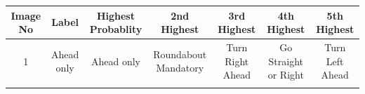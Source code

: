 \documentclass[11pt]{article}
\begin{document}
\begin{longtable}[]{@{}ccccccc@{}}
\toprule
\begin{minipage}[b]{0.04\columnwidth}\centering\strut
Image No\strut
\end{minipage} & \begin{minipage}[b]{0.04\columnwidth}\centering\strut
Label\strut
\end{minipage} & \begin{minipage}[b]{0.04\columnwidth}\centering\strut
Highest Probablity\strut
\end{minipage} & \begin{minipage}[b]{0.04\columnwidth}\centering\strut
2nd Highest\strut
\end{minipage} & \begin{minipage}[b]{0.04\columnwidth}\centering\strut
3rd Highest\strut
\end{minipage} & \begin{minipage}[b]{0.04\columnwidth}\centering\strut
4th Highest\strut
\end{minipage} & \begin{minipage}[b]{0.04\columnwidth}\centering\strut
5th Highest\strut
\end{minipage}\tabularnewline
\midrule
\endhead
\begin{minipage}[t]{0.04\columnwidth}\centering\strut
1\strut
\end{minipage} & \begin{minipage}[t]{0.04\columnwidth}\centering\strut
Ahead only\strut
\end{minipage} & \begin{minipage}[t]{0.04\columnwidth}\centering\strut
Ahead only\strut
\end{minipage} & \begin{minipage}[t]{0.04\columnwidth}\centering\strut
Roundabout Mandatory\strut
\end{minipage} & \begin{minipage}[t]{0.04\columnwidth}\centering\strut
Turn Right Ahead\strut
\end{minipage} & \begin{minipage}[t]{0.04\columnwidth}\centering\strut
Go Straight or Right\strut
\end{minipage} & \begin{minipage}[t]{0.04\columnwidth}\centering\strut
Turn Left Ahead\strut
\end{minipage}\tabularnewline
\begin{minipage}[t]{0.04\columnwidth}\centering\strut

\end{minipage}
\end{longtable}
\end{document}
